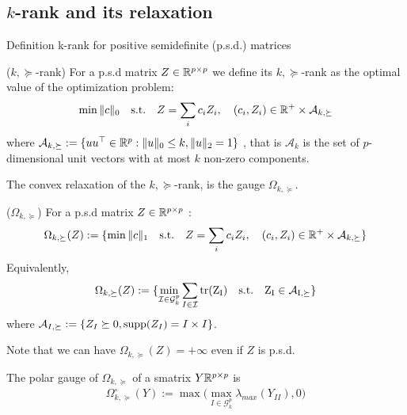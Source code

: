\subsection{$k$-rank and its relaxation}

Definition k-rank for positive semidefinite (p.s.d.) matrices
\begin{mydef}
($k,\succeq$-rank) For a p.s.d  matrix $Z\in\mathbb{R}^{p\times p}$  we define its $k,\succeq$-rank as the optimal
value of the optimization problem:
\begin{align}
\min \|c\|_0 \quad \text{s.t.} \quad Z=\sum_{i} c_i Z_i, \quad (c_i,Z_i)\in \mathbb{R}^{+}\times\mathcal{A}_{k,\succeq}
\end{align}
where  $\mathcal{A}_{k,\succeq}:=\{u u^\top \in\mathbb{R}^p  :   \|u\|_0 \leq k, \|u\|_2 = 1\}$ , that is $\mathcal{A}_k$ is the set of $p$-dimensional unit vectors with at most $k$ non-zero components.
\end{mydef}

The convex relaxation of the $k,\succeq$-rank, is the gauge $\Omega_{k,\succeq}$. 

\begin{mydef}
($\Omega_{k,\succeq}$) For a p.s.d  matrix $Z\in\mathbb{R}^{p\times p}$  :
\begin{align}
\Omega_{k,\succeq}(Z):=\{\min \|c\|_1 \quad \text{s.t.} \quad Z=\sum_{i} c_i Z_i, \quad (c_i,Z_i)\in \mathbb{R}^{+}\times\mathcal{A}_{k,\succeq}\}
\end{align}
Equivalently, 
\begin{align}
\Omega_{k,\succeq}(Z):=\{\min_{\mathcal{I}\in\mathcal{G}^p_k} \sum_{I\in\mathcal{I}}\rm tr(Z_I) \quad \text{s.t.} \quad Z_I\in\mathcal{A}_{I,\succeq}\}
\end{align}
where  $\mathcal{A}_{I,\succeq}:=\{Z_I\succeq 0 ,\text{supp}(Z_I)=I\times I\}$.
\end{mydef}

Note that we can have $\Omega_{k,\succeq}(Z)=+\infty$ even if $Z$ is p.s.d.

\begin{lemm} The polar gauge of $\Omega_{k,\succeq}$ of a smatrix $Y\mathbb{R}^{p\times p}$ is
\begin{align}
\Omega_{k,\succeq}^{\circ}(Y):= \max\big(\max_{I\in\mathcal{G}^p_k}\lambda_{max}(Y_{II}),0\big)
\end{align}
\end{lemm}

